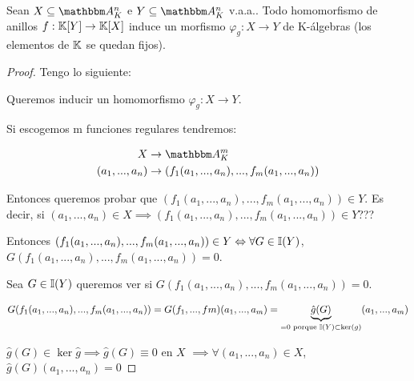 	\begin{prop} \label{prop:HomomorfismoInduceMorfismo}
		Sean $X \subseteq \Akn$ e $Y \subseteq \Akn$ v.a.a.. Todo homomorfismo de anillos $f: \mathbb{K}[Y] \rightarrow \mathbb{K}[X]$ induce un morfismo $\varphi_g: X \rightarrow Y$ de K-álgebras (los elementos de $\mathbb{K}$ se quedan fijos).
	\end{prop}

	\begin{proof}
		Tengo lo siguiente:


		Queremos inducir un homomorfismo $\varphi_g: X \rightarrow Y$.

		Si escogemos m funciones regulares tendremos:


		\begin{align*}
			X & \rightarrow \A_K^m \\
			(a_1,...,a_n) & \rightarrow (f_1(a_1,...,a_n),...,f_m(a_1,...,a_n))
		\end{align*}

		Entonces queremos probar que $(f_1(a_1,...,a_n),...,f_m(a_1,...,a_n)) \in Y$. Es decir, si $(a_1,...,a_n) \in X \implies (f_1(a_1,...,a_n),...,f_m(a_1,...,a_n)) \in Y$???

		Entonces $(f_1(a_1,...,a_n),...,f_m(a_1,...,a_n)) \in Y \Leftrightarrow \forall G \in \mathbb{I}(Y)$, $G(f_1(a_1,...,a_n),...,f_m(a_1,...,a_n))=0$.

		Sea $G\in \mathbb{I}(Y)$ queremos ver si $G(f_1(a_1,...,a_n),...,f_m(a_1,...,a_n))=0$.

		$$G(f_1(a_1,...,a_n),...,f_m(a_1,...,a_n))=G(f_1,...,fm)(a_1,...,a_m)= \underbrace{\hat{g}(G)}_{=0 \text{ porque } \mathbb{I}(Y) \subset \ker(g)}(a_1,...,a_m)$$

		$\hat{g}(G) \in \ker \hat{g} \implies \hat{g}(G) \equiv 0$ en $X$ $\implies \forall(a_1,...,a_n) \in X$, $\hat{g}(G)(a_1,...,a_n)=0$
	\end{proof}

